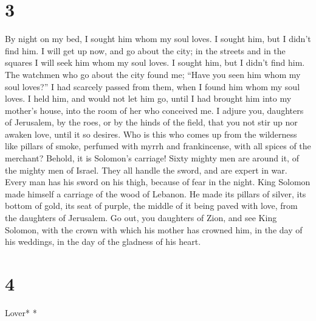 \hypertarget{section-2}{%
\section{3}\label{section-2}}

 By night on my bed, I sought him whom my soul loves. I
sought him, but I didn't find him.  I will get up now, and
go about the city; in the streets and in the squares I will seek him
whom my soul loves. I sought him, but I didn't find him. 
The watchmen who go about the city found me; ``Have you seen him whom my
soul loves?''  I had scarcely passed from them, when I
found him whom my soul loves. I held him, and would not let him go,
until I had brought him into my mother's house, into the room of her who
conceived me.  I adjure you, daughters of Jerusalem, by
the roes, or by the hinds of the field, that you not stir up nor awaken
love, until it so desires.  Who is this who comes up from
the wilderness like pillars of smoke, perfumed with myrrh and
frankincense, with all spices of the merchant?  Behold, it
is Solomon's carriage! Sixty mighty men are around it, of the mighty men
of Israel.  They all handle the sword, and are expert in
war. Every man has his sword on his thigh, because of fear in the night.
 King Solomon made himself a carriage of the wood of
Lebanon.  He made its pillars of silver, its bottom of
gold, its seat of purple, the middle of it being paved with love, from
the daughters of Jerusalem.  Go out, you daughters of
Zion, and see King Solomon, with the crown with which his mother has
crowned him, in the day of his weddings, in the day of the gladness of
his heart.

\hypertarget{section-3}{%
\section{4}\label{section-3}}

\emph{\hfill\break
}Lover* *\\

